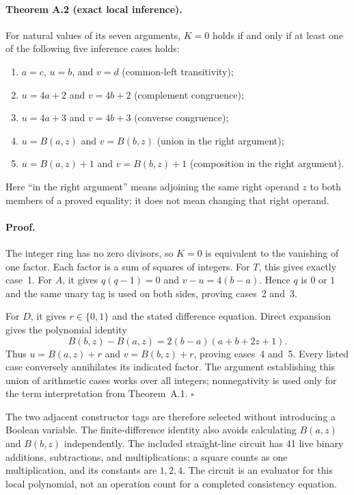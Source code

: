 \paragraph{Theorem A.2 (exact local inference).}
For natural values of its seven arguments, $K=0$ holds if and only if at
least one of the following five inference cases holds:
\begin{enumerate}
\item $a=c$, $u=b$, and $v=d$ (common-left transitivity);
\item $u=4a+2$ and $v=4b+2$ (complement congruence);
\item $u=4a+3$ and $v=4b+3$ (converse congruence);
\item $u=B(a,z)$ and $v=B(b,z)$ (union in the right argument);
\item $u=B(a,z)+1$ and $v=B(b,z)+1$ (composition in the right argument).
\end{enumerate}
Here ``in the right argument'' means adjoining the same right operand
$z$ to both members of a proved equality; it does not mean changing that
right operand.

\paragraph{Proof.}
The integer ring has no zero divisors, so $K=0$ is equivalent to the
vanishing of one factor.  Each factor is a sum of squares of integers.
For $T$, this gives exactly case~1.  For $A$, it gives
$q(q-1)=0$ and $v-u=4(b-a)$.  Hence $q$ is $0$ or $1$ and the same unary
tag is used on both sides, proving cases~2 and~3.

For $D$, it gives $r\in\{0,1\}$ and the stated difference equation.
Direct expansion gives the polynomial identity
\[
 B(b,z)-B(a,z)=2(b-a)(a+b+2z+1).
\]
Thus $u=B(a,z)+r$ and $v=B(b,z)+r$, proving cases~4 and~5.
Every listed case conversely annihilates its indicated factor.
The argument establishing this union of arithmetic cases works over all
integers; nonnegativity is used only for the term interpretation from
Theorem~A.1. \hfill$\square$

The two adjacent constructor tags are therefore selected without
introducing a Boolean variable.  The finite-difference identity also
avoids calculating $B(a,z)$ and $B(b,z)$ independently.  The included
straight-line circuit has 41 live binary additions, subtractions, and
multiplications; a square counts as one multiplication, and its constants
are $1,2,4$.  The circuit is an evaluator for this local polynomial, not
an operation count for a completed consistency equation.

